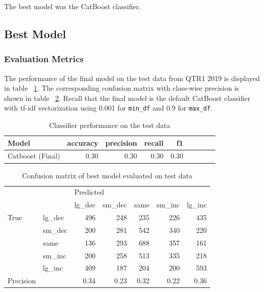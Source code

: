 \documentclass{article}
\begin{document}
	The best model was the CatBoost classifier.

	\subsection{Best Model}
	
	\subsubsection{Evaluation Metrics}

	The performance of the final model on the test data from QTR1 2019 is displayed in table ~\ref{table:results_test}. The corresponding confusion matrix with class-wise precision is shown in table ~\ref{table:best_model_cm_abs}. Recall that the final model is the default CatBoost classifier with tf-idf vectorization using 0.001 for \lstinline{min_df} and 0.9 for \lstinline{max_df}.

	\begin{table}[h!]
	\centering
	\caption{Classifier performance on the test data}
	\label{table:results_test}
	
	\begin{tabular}{lrrrrrrrr}
		\toprule
		Model &     accuracy &     precision &     recall &    f1 \\
		\midrule
		Catboost (Final)   &  0.30 &  0.30 &   0.30 &  0.30 \\
		\bottomrule
	\end{tabular}
	
	\end{table}%


	\begin{table}[h!]
	\centering
	\caption{Confusion matrix of best model evaluated on test data}
	\label{table:best_model_cm_abs}
	
	\begin{tabular}{llrrrrr}
		\toprule
		&        & \multicolumn{5}{l}{Predicted} \\
		&        &    lg\_dec & sm\_dec & same & sm\_inc & lg\_inc \\
		\midrule
		True & lg\_dec &       496 &    248 &  235 &    226 &    435 \\
		& sm\_dec &       200 &    281 &  542 &    340 &    220 \\
		& same &       136 &    293 &  688 &    357 &    161 \\
		& sm\_inc &       200 &    258 &  513 &    335 &    218 \\
		& lg\_inc &       409 &    187 &  204 &    200 &    593 \\
\bottomrule
		Precision &  &    0.34 &  0.23 &  0.32 &   0.22 &    0.36 \\
		\bottomrule
	\end{tabular}

	\end{table}%
\end{document}
